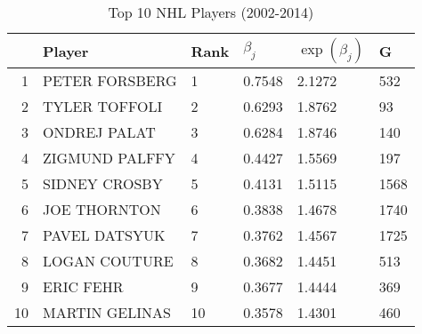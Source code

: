 \begin{table}[ht]
\centering
\begin{tabular}{rlllll}
  \hline
 & Player & Rank & $\beta_j$ & $\exp(\beta_j)$ & G \\ 
  \hline
1 & PETER FORSBERG & 1 & 0.7548 & 2.1272 & 532 \\ 
  2 & TYLER TOFFOLI & 2 & 0.6293 & 1.8762 & 93 \\ 
  3 & ONDREJ PALAT & 3 & 0.6284 & 1.8746 & 140 \\ 
  4 & ZIGMUND PALFFY & 4 & 0.4427 & 1.5569 & 197 \\ 
  5 & SIDNEY CROSBY & 5 & 0.4131 & 1.5115 & 1568 \\ 
  6 & JOE THORNTON & 6 & 0.3838 & 1.4678 & 1740 \\ 
  7 & PAVEL DATSYUK & 7 & 0.3762 & 1.4567 & 1725 \\ 
  8 & LOGAN COUTURE & 8 & 0.3682 & 1.4451 & 513 \\ 
  9 & ERIC FEHR & 9 & 0.3677 & 1.4444 & 369 \\ 
  10 & MARTIN GELINAS & 10 & 0.3578 & 1.4301 & 460 \\ 
   \hline
\end{tabular}
\caption{Top 10 NHL Players (2002-2014)} 
\label{tab:best10}
\end{table}
